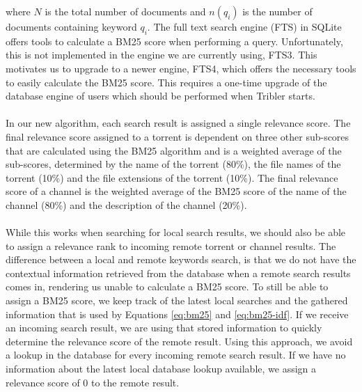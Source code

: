 where $ N $ is the total number of documents and $ n(q_i) $ is the number of documents containing keyword $ q_i $. The full text search engine (FTS) in SQLite offers tools to calculate a BM25 score when performing a query. Unfortunately, this is not implemented in the engine we are currently using, FTS3. This motivates us to upgrade to a newer engine, FTS4, which offers the necessary tools to easily calculate the BM25 score. This requires a one-time upgrade of the database engine of users which should be performed when Tribler starts.\\\\
In our new algorithm, each search result is assigned a single relevance score. The final relevance score assigned to a torrent is dependent on three other sub-scores that are calculated using the BM25 algorithm and is a weighted average of the sub-scores, determined by the name of the torrent (80\%), the file names of the torrent (10\%) and the file extensions of the torrent (10\%). The final relevance score of a channel is the weighted average of the BM25 score of the name of the channel (80\%) and the description of the channel (20\%).\\\\
While this works when searching for local search results, we should also be able to assign a relevance rank to incoming remote torrent or channel results. The difference between a local and remote keywords search, is that we do not have the contextual information retrieved from the database when a remote search results comes in, rendering us unable to calculate a BM25 score. To still be able to assign a BM25 score, we keep track of the latest local searches and the gathered information that is used by Equations \ref{eq:bm25} and \ref{eq:bm25-idf}. If we receive an incoming search result, we are using that stored information to quickly determine the relevance score of the remote result. Using this approach, we avoid a lookup in the database for every incoming remote search result. If we have no information about the latest local database lookup available, we assign a relevance score of 0 to the remote result.

